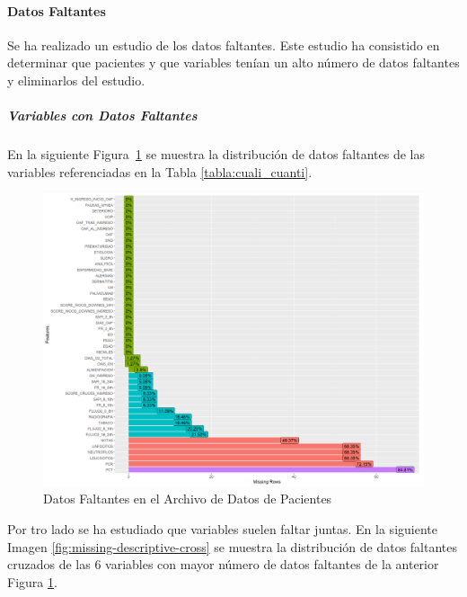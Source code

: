 \paragraph{Datos Faltantes}

Se ha realizado un estudio de los datos faltantes. Este estudio ha consistido en determinar que pacientes y que variables tenían un alto número de datos faltantes y eliminarlos del estudio. 

\subparagraph*{Variables con Datos Faltantes} 

En la siguiente Figura~\ref{fig:missing-descriptive} se muestra la distribución de datos faltantes de las variables referenciadas en la Tabla \ref{tabla:cuali_cuanti}. 
 
\begin{figure}[H]
    \centering
    \includegraphics[scale = 0.70]{./img/missig-data-descriptive.png}
    \caption{Datos Faltantes en el Archivo de Datos de Pacientes}
    \label{fig:missing-descriptive}
\end{figure}

Por tro lado se ha estudiado que variables suelen faltar juntas. En la siguiente Imagen \ref{fig:missing-descriptive-cross} se muestra la distribución de datos faltantes cruzados de las 6 variables con mayor número de datos faltantes de la anterior Figura \ref{fig:missing-descriptive}.

